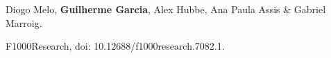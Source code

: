 \documentclass[12pt,twoside]{report}
\begin{document}
Diogo Melo, \textbf{Guilherme Garcia}, Alex Hubbe, Ana Paula Assis \& Gabriel Marroig.  

F1000Research, doi: 10.12688/f1000research.7082.1.






\end{document}
